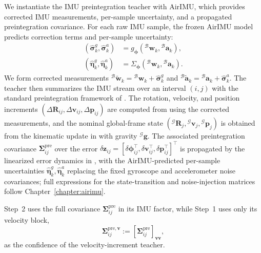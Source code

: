 We instantiate the IMU preintegration teacher with AirIMU, which provides corrected IMU measurements, per-sample uncertainty, and a propagated preintegration covariance.
For each raw IMU sample, the frozen AirIMU model predicts correction terms and per-sample uncertainty:
\begin{equation}
\begin{split}
(\hat{\boldsymbol{\sigma}}^g_k,\hat{\boldsymbol{\sigma}}^a_k) &= g_{\boldsymbol{\phi}}({}^\mathcal{B}\mathbf{w}_k,{}^\mathcal{B}\mathbf{a}_k), \\
(\hat{\boldsymbol{\eta}}^g_k,\hat{\boldsymbol{\eta}}^a_k) &= \Sigma_{\boldsymbol{\phi}}({}^\mathcal{B}\mathbf{w}_k,{}^\mathcal{B}\mathbf{a}_k).
\end{split}
\label{eq:macio:airimu_outputs}
\end{equation}
We form corrected measurements ${}^\mathcal{B}\tilde{\mathbf{w}}_k={}^\mathcal{B}\mathbf{w}_k+\hat{\boldsymbol{\sigma}}^g_k$ and ${}^\mathcal{B}\tilde{\mathbf{a}}_k={}^\mathcal{B}\mathbf{a}_k+\hat{\boldsymbol{\sigma}}^a_k$.
The teacher then summarizes the IMU stream over an interval $(i,j)$ with the standard preintegration framework of .
The rotation, velocity, and position increments $(\Delta\mathbf{R}_{ij},\Delta\mathbf{v}_{ij},\Delta\mathbf{p}_{ij})$ are computed from  using the corrected measurements, and the nominal global-frame state $({}^\mathcal{G}\mathbf{R}_j,{}^\mathcal{G}\mathbf{v}_j,{}^\mathcal{G}\mathbf{p}_j)$ is obtained from the kinematic update in  with gravity ${}^\mathcal{G}\mathbf{g}$.
The associated preintegration covariance $\boldsymbol{\Sigma}^{\mathrm{pre}}_{ij}$ over the error $\delta\mathbf{z}_{ij}=[\delta\boldsymbol{\phi}_{ij}^{\top},\delta\mathbf{v}_{ij}^{\top},\delta\mathbf{p}_{ij}^{\top}]^{\top}$ is propagated by the linearized error dynamics in , with the AirIMU-predicted per-sample uncertainties $\hat{\boldsymbol{\eta}}^g_k,\hat{\boldsymbol{\eta}}^a_k$ replacing the fixed gyroscope and accelerometer noise covariances; full expressions for the state-transition and noise-injection matrices follow Chapter~\ref{chapter:airimu}.

Step~2 uses the full covariance $\boldsymbol{\Sigma}^{\mathrm{pre}}_{ij}$ in its IMU factor, while Step~1 uses only its velocity block,
\begin{equation}
\boldsymbol{\Sigma}^{\mathrm{pre},\mathbf{v}}_{ij}
:=
\left[\boldsymbol{\Sigma}^{\mathrm{pre}}_{ij}\right]_{\mathbf{v}\mathbf{v}},
\label{eq:macio:preintegration_velocity_block}
\end{equation}
as the confidence of the velocity-increment teacher.


